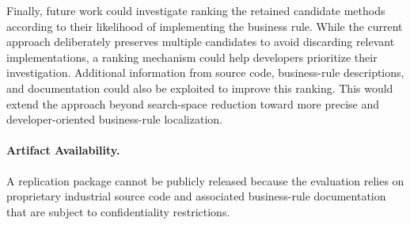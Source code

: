 Finally, future work could investigate ranking the retained candidate methods according to their likelihood of implementing the business rule. While the current approach deliberately preserves multiple candidates to avoid discarding relevant implementations, a ranking mechanism could help developers prioritize their investigation. Additional information from source code, business-rule descriptions, and documentation could also be exploited to improve this ranking. This would extend the approach beyond search-space reduction toward more precise and developer-oriented business-rule localization.

\paragraph{Artifact Availability.}\noindent

A replication package cannot be publicly released because the evaluation relies on proprietary industrial source code and associated business-rule documentation that are subject to confidentiality restrictions.